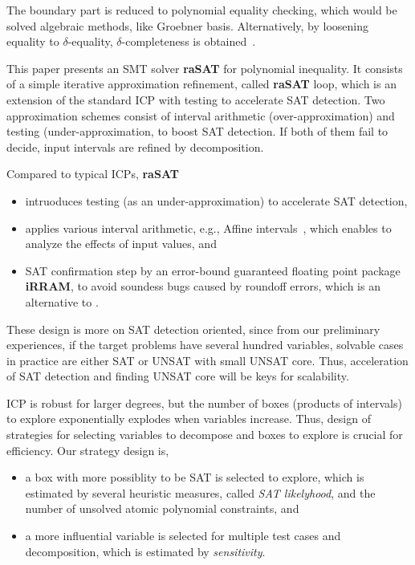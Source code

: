 \documentclass[runningheads,a4paper,oribibl]{llncs}
\begin{document}
The boundary part is reduced to polynomial equality checking, 
which would be solved algebraic methods, like Groebner basis. 
Alternatively, by loosening equality to $\delta$-equality, 
$\delta$-completeness is obtained~\cite{dRealIJCAR12,dRealLICS12}. 

This paper presents an SMT solver {\bf raSAT} for polynomial inequality. 
It consists of a simple iterative approximation refinement, called {\bf raSAT} loop, 
which is an extension of the standard ICP with testing to accelerate SAT detection. 
Two approximation schemes consist of interval arithmetic (over-approximation) and 
testing (under-approximation, to boost SAT detection. 
If both of them fail to decide, input intervals are refined by decomposition. 

Compared to typical ICPs, {\bf raSAT} 
\begin{itemize}
\item intruoduces testing (as an under-approximation) to accelerate SAT detection, 
\item applies various interval arithmetic, e.g., Affine intervals~\cite{Stolfi03,ngocase,tapas12}, 
which enables to analyze the effects of input values, and 
\item SAT confirmation step by an error-bound guaranteed floating point package {\bf iRRAM}, 
to avoid soundess bugs caused by roundoff errors, which is an alternative to \cite{SilvaTACAS12}. 
\end{itemize}
These design is more on SAT detection oriented, since from our preliminary experiences, 
if the target problems have several hundred variables, solvable cases in practice are 
either SAT or UNSAT with small UNSAT core. 
Thus, acceleration of SAT detection and finding UNSAT core will be keys for scalability. 

ICP is robust for larger degrees, but the number of boxes (products of intervals) to explore 
exponentially explodes when variables increase. 
Thus, design of strategies for selecting variables to decompose and boxes to explore is crucial 
for efficiency. 
Our strategy design is, 
\begin{itemize}
\item a box with more possiblity to be SAT is selected to explore, which is estimated by 
several heuristic measures, called {\em SAT likelyhood}, 
and the number of unsolved atomic polynomial constraints, and
\item a more influential variable is selected for multiple test cases and decomposition, 
which is estimated by {\em sensitivity}. 
\end{itemize} 
\end{document}

